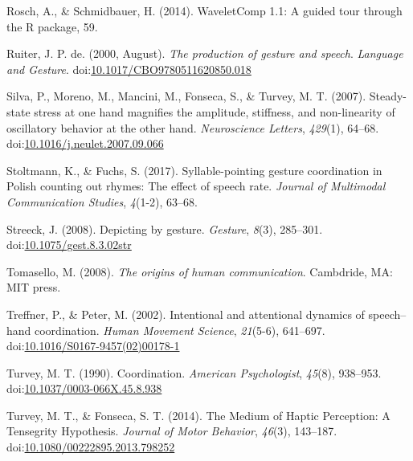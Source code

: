 \documentclass[
  man,floatsintext]{apa6}
\newlength{\cslhangindent}
\newenvironment{cslreferences}%
  {\setlength{\parindent}{0pt}%
  \everypar{\setlength{\hangindent}{\cslhangindent}}\ignorespaces}%
  {\par}
\begin{document}
\begin{cslreferences}
\leavevmode\hypertarget{ref-roschWaveletCompGuidedTour2014}{}%
Rosch, A., \& Schmidbauer, H. (2014). WaveletComp 1.1: A guided tour through the R package, 59.

\leavevmode\hypertarget{ref-ruiterProductionGestureSpeech2000}{}%
Ruiter, J. P. de. (2000, August). \emph{The production of gesture and speech}. \emph{Language and Gesture}. doi:\href{https://doi.org/10.1017/CBO9780511620850.018}{10.1017/CBO9780511620850.018}

\leavevmode\hypertarget{ref-silvaSteadystateStressOne2007}{}%
Silva, P., Moreno, M., Mancini, M., Fonseca, S., \& Turvey, M. T. (2007). Steady-state stress at one hand magnifies the amplitude, stiffness, and non-linearity of oscillatory behavior at the other hand. \emph{Neuroscience Letters}, \emph{429}(1), 64--68. doi:\href{https://doi.org/10.1016/j.neulet.2007.09.066}{10.1016/j.neulet.2007.09.066}

\leavevmode\hypertarget{ref-stoltmannSyllablepointingGestureCoordination2017}{}%
Stoltmann, K., \& Fuchs, S. (2017). Syllable-pointing gesture coordination in Polish counting out rhymes: The effect of speech rate. \emph{Journal of Multimodal Communication Studies}, \emph{4}(1-2), 63--68.

\leavevmode\hypertarget{ref-streeckDepictingGesture2008}{}%
Streeck, J. (2008). Depicting by gesture. \emph{Gesture}, \emph{8}(3), 285--301. doi:\href{https://doi.org/10.1075/gest.8.3.02str}{10.1075/gest.8.3.02str}

\leavevmode\hypertarget{ref-tomaselloOriginsHumanCommunication2008}{}%
Tomasello, M. (2008). \emph{The origins of human communication}. Cambdride, MA: MIT press.

\leavevmode\hypertarget{ref-treffnerIntentionalAttentionalDynamics2002}{}%
Treffner, P., \& Peter, M. (2002). Intentional and attentional dynamics of speech--hand coordination. \emph{Human Movement Science}, \emph{21}(5-6), 641--697. doi:\href{https://doi.org/10.1016/S0167-9457(02)00178-1}{10.1016/S0167-9457(02)00178-1}

\leavevmode\hypertarget{ref-turveyCoordination1990}{}%
Turvey, M. T. (1990). Coordination. \emph{American Psychologist}, \emph{45}(8), 938--953. doi:\href{https://doi.org/10.1037/0003-066X.45.8.938}{10.1037/0003-066X.45.8.938}

\leavevmode\hypertarget{ref-turveyMediumHapticPerception2014}{}%
Turvey, M. T., \& Fonseca, S. T. (2014). The Medium of Haptic Perception: A Tensegrity Hypothesis. \emph{Journal of Motor Behavior}, \emph{46}(3), 143--187. doi:\href{https://doi.org/10.1080/00222895.2013.798252}{10.1080/00222895.2013.798252}


\end{cslreferences}
\end{document}
